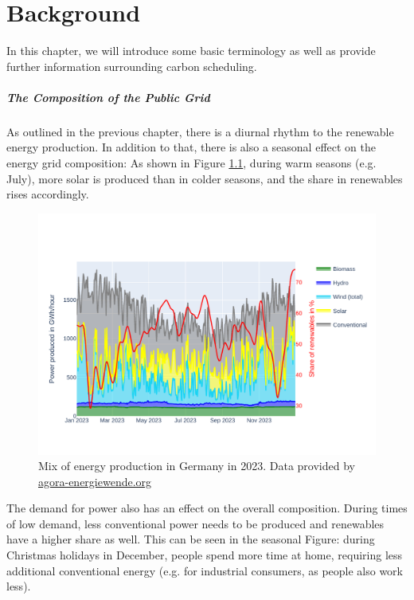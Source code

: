 \chapter{Background}
\label{chap:backgroud}

In this chapter, we will introduce some basic terminology as well as provide further information surrounding carbon scheduling.

\paragraph{The Composition of the Public Grid}

As outlined in the previous chapter, there is a diurnal rhythm to the renewable energy production.
In addition to that, there is also a seasonal effect on the energy grid composition:
As shown in Figure \ref{fig:energy_mix_year}, during warm seasons (e.g. July), more solar is produced than in colder seasons, and the share in renewables rises accordingly.

\begin{figure}
    \includegraphics[width=\linewidth]{agorameter/energy_production_year.pdf}
    \caption[short]{Mix of energy production in Germany in 2023. Data provided by \url{agora-energiewende.org}}
    \label{fig:energy_mix_year}
\end{figure}

The demand for power also has an effect on the overall composition. 
During times of low demand, less conventional power needs to be produced and renewables have a higher share as well.
This can be seen in the seasonal Figure: during Christmas holidays in December, people spend more time at home, requiring less additional conventional energy (e.g. for industrial consumers, as people also work less).

